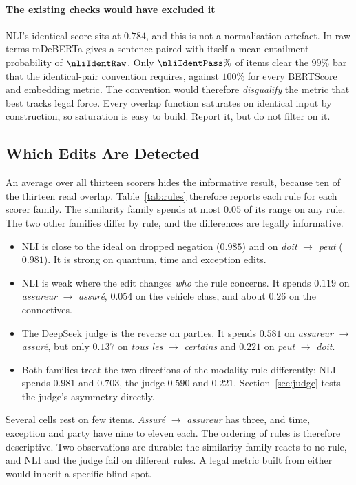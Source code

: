 \documentclass{BVP_JCLLT}
\newcommand{\rev}[1]{#1}
\newcommand{\rev}[1]{{\color{revcol}#1}}
\begin{document}
\paragraph{The existing checks would have excluded it}
\rev{NLI's identical score sits at $0.784$, and this is not a normalisation
artefact. In raw terms mDeBERTa gives a sentence paired with itself a mean
entailment probability of $\nliIdentRaw$. Only $\nliIdentPass\%$ of items clear
the $99\%$ bar that the identical-pair convention requires, against $100\%$ for
every BERTScore and embedding metric. The convention would therefore
\emph{disqualify} the metric that best tracks legal force. Every overlap
function saturates on identical input by construction, so saturation is easy to
build. Report it, but do not filter on it.}

\subsection{Which Edits Are Detected}\label{sec:rules}

\rev{An average over all thirteen scorers hides the informative result, because
ten of the thirteen read overlap. Table~\ref{tab:rules} therefore reports each
rule for each scorer family. The similarity family spends at most $0.05$ of its
range on any rule. The two other families differ by rule, and the differences
are legally informative.

\begin{itemize}\itemsep2pt
\item NLI is close to the ideal on dropped negation ($0.985$) and on
  \emph{doit} $\rightarrow$ \emph{peut} ($0.981$). It is strong on quantum,
  time and exception edits.
\item NLI is weak where the edit changes \emph{who} the rule concerns. It spends
  $0.119$ on \emph{assureur} $\rightarrow$ \emph{assur\'e}, $0.054$ on the
  vehicle class, and about $0.26$ on the connectives.
\item The DeepSeek judge is the reverse on parties. It spends $0.581$ on
  \emph{assureur} $\rightarrow$ \emph{assur\'e}, but only $0.137$ on
  \emph{tous les} $\rightarrow$ \emph{certains} and $0.221$ on \emph{peut}
  $\rightarrow$ \emph{doit}.
\item Both families treat the two directions of the modality rule differently:
  NLI spends $0.981$ and $0.703$, the judge $0.590$ and $0.221$.
  Section~\ref{sec:judge} tests the judge's asymmetry directly.
\end{itemize}

Several cells rest on few items. \emph{Assur\'e} $\rightarrow$
\emph{assureur} has three, and time, exception and party have nine to eleven
each. The ordering of rules is therefore descriptive. Two observations are
durable: the similarity family reacts to no rule, and NLI and the judge fail on
different rules. A legal
metric built from either would inherit a specific blind spot.}
\end{document}
